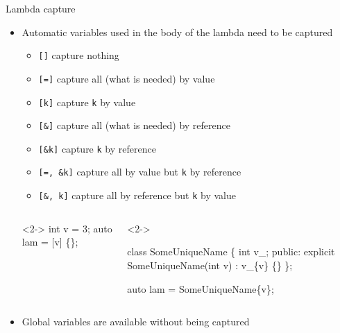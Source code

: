 \begin{frame}[fragile]{Lambda capture}

  \begin{itemize}
  \item Automatic variables used in the body of the lambda need to be captured
    \begin{itemize}
    \item<2-> \texttt{[]} capture nothing
    \item<2-> \texttt{[=]} capture all (what is needed) by value
    \item<2-> \texttt{[k]} capture \texttt{k} by value
    \item<3-> \texttt{[\&]} capture all (what is needed) by reference
    \item<3-> \texttt{[\&k]} capture \texttt{k} by reference
    \item<4-> \texttt{[=, \&k]} capture all by value but \texttt{k} by reference
    \item<4-> \texttt{[\&, k]} capture all by reference but \texttt{k} by value
    \end{itemize}

    \vskip -3mm

    \begin{columns}[T]
      \begin{column}{.5\textwidth}
        \begin{codeblock}<2->{
int v = 3;
auto lam = [v] \{\};}\end{codeblock}
      \end{column}

      \begin{column}{.5\textwidth}
        \begin{codeblock}<2->{
class SomeUniqueName \{
  int v\_;
 public:
  explicit SomeUniqueName(int v)
    : v\_\{v\} \{\}
  \ddd
\};

auto lam = SomeUniqueName\{v\};}\end{codeblock}
      \end{column}
    \end{columns}

  \item<5-> Global variables are available without being captured
  \end{itemize}
\end{frame}

